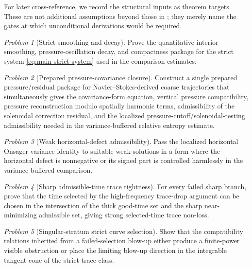 \documentclass[11pt]{article}
\numberwithin{equation}{section}
\theoremstyle{plain}
\theoremstyle{definition}
\theoremstyle{remark}
\newtheorem{problem}{Problem}[section]
\begin{document}
For later cross-reference, we record the structural inputs as theorem targets.  These are not additional assumptions beyond those in ; they merely name the gates at which unconditional derivations would be required.

\begin{problem}[Strict smoothing and decay]\label{prob:strict-smoothing}
Prove the quantitative interior smoothing, pressure-oscillation decay, and compactness package for the strict system \eqref{eq:main-strict-system} used in the comparison estimates.
\end{problem}

\begin{problem}[Prepared pressure-covariance closure]\label{prob:prepared-pressure-closure}
Construct a single prepared pressure/residual package for Navier--Stokes-derived coarse trajectories that simultaneously gives the covariance-form equation, vertical pressure compatibility, pressure reconstruction modulo spatially harmonic terms, admissibility of the solenoidal correction residual, and the localized pressure-cutoff/solenoidal-testing admissibility needed in the variance-buffered relative entropy estimate.
\end{problem}

\begin{problem}[Weak horizontal-defect admissibility]\label{prob:weak-defect}
Pass the localized horizontal Onsager variance identity to suitable weak solutions in a form where the horizontal defect is nonnegative or its signed part is controlled harmlessly in the variance-buffered comparison.
\end{problem}

\begin{problem}[Sharp admissible-time trace tightness]\label{prob:sharp-time}
For every failed sharp branch, prove that the time selected by the high-frequency trace-drop argument can be chosen in the intersection of the thick good-time set and the sharp near-minimizing admissible set, giving strong selected-time trace non-loss.
\end{problem}

\begin{problem}[Singular-stratum strict curve selection]\label{prob:singular-curve-selection}
Show that the compatibility relations inherited from a failed-selection blow-up either produce a finite-power visible obstruction or place the limiting blow-up direction in the integrable tangent cone of the strict trace class.
\end{problem}
\end{document}
